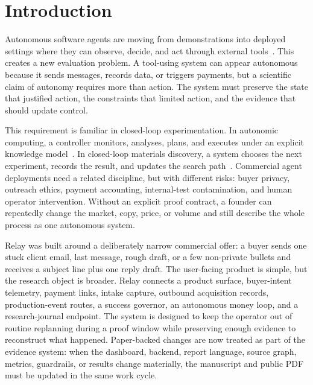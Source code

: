 \documentclass[12pt,letterpaper]{article}
\begin{document}
\newpage
\pagestyle{fancy}

\section{Introduction}

Autonomous software agents are moving from demonstrations into deployed settings where they can observe, decide, and act through external tools~\cite{yao_react_2023,schick_toolformer_2023,park_generative_2023,wu_autogen_2023,wang_survey_2023}. This creates a new evaluation problem. A tool-using system can appear autonomous because it sends messages, records data, or triggers payments, but a scientific claim of autonomy requires more than action. The system must preserve the state that justified action, the constraints that limited action, and the evidence that should update control.

This requirement is familiar in closed-loop experimentation. In autonomic computing, a controller monitors, analyses, plans, and executes under an explicit knowledge model~\cite{kephart_vision_2003}. In closed-loop materials discovery, a system chooses the next experiment, records the result, and updates the search path~\cite{kusne_closed_loop_2020}. Commercial agent deployments need a related discipline, but with different risks: buyer privacy, outreach ethics, payment accounting, internal-test contamination, and human operator intervention. Without an explicit proof contract, a founder can repeatedly change the market, copy, price, or volume and still describe the whole process as one autonomous system.

Relay was built around a deliberately narrow commercial offer: a buyer sends one stuck client email, last message, rough draft, or a few non-private bullets and receives a subject line plus one reply draft. The user-facing product is simple, but the research object is broader. Relay connects a product surface, buyer-intent telemetry, payment links, intake capture, outbound acquisition records, production-event routes, a success governor, an autonomous money loop, and a research-journal endpoint. The system is designed to keep the operator out of routine replanning during a proof window while preserving enough evidence to reconstruct what happened. Paper-backed changes are now treated as part of the evidence system: when the dashboard, backend, report language, source graph, metrics, guardrails, or results change materially, the manuscript and public PDF must be updated in the same work cycle.
\end{document}
